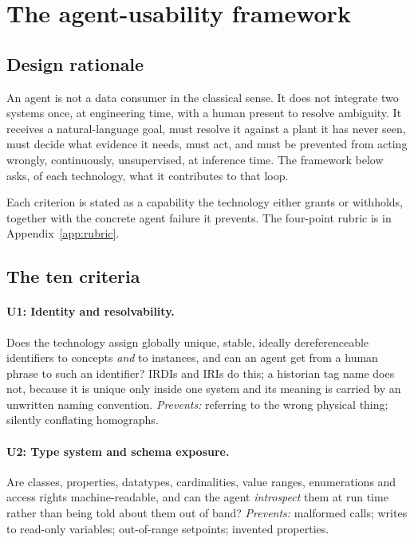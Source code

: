 \section{The agent-usability framework}
\label{sec:framework}

\subsection{Design rationale}

An agent is not a data consumer in the classical sense. It does not integrate
two systems once, at engineering time, with a human present to resolve
ambiguity. It receives a natural-language goal, must resolve it against a plant
it has never seen, must decide what evidence it needs, must act, and must be
prevented from acting wrongly, continuously, unsupervised, at inference time.
The framework below asks, of each technology, what it contributes to that loop.

Each criterion is stated as a capability the technology either grants or
withholds, together with the concrete agent failure it prevents. The four-point
rubric is in Appendix~\ref{app:rubric}.

\subsection{The ten criteria}

\paragraph{U1: Identity and resolvability.}
Does the technology assign globally unique, stable, ideally dereferenceable
identifiers to concepts \emph{and} to instances, and can an agent get from a
human phrase to such an identifier? IRDIs and IRIs do this; a historian tag name
does not, because it is unique only inside one system and its meaning is carried
by an unwritten naming convention. \emph{Prevents:} referring to the wrong
physical thing; silently conflating homographs.

\paragraph{U2: Type system and schema exposure.}
Are classes, properties, datatypes, cardinalities, value ranges, enumerations
and access rights machine-readable, and can the agent \emph{introspect} them at
run time rather than being told about them out of band? \emph{Prevents:}
malformed calls; writes to read-only variables; out-of-range setpoints;
invented properties.

